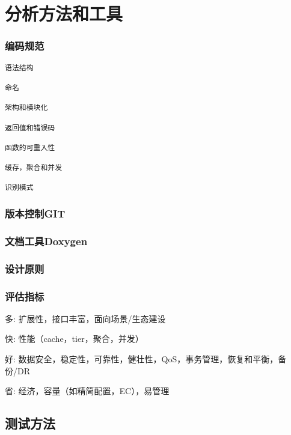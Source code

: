\chapter{分析方法和工具}

\subsection{编码规范}

\begin{lstlisting}
语法结构

命名

架构和模块化

返回值和错误码

函数的可重入性

缓存，聚合和并发

识别模式
\end{lstlisting}

\subsection{版本控制GIT}

\subsection{文档工具Doxygen}


\subsection{设计原则}

\subsection{评估指标}

\begin{itembox}
\item 多: 扩展性，接口丰富，面向场景/生态建设
\item 快: 性能（cache，tier，聚合，并发）
\item 好: 数据安全，稳定性，可靠性，健壮性，QoS，事务管理，恢复和平衡，备份/DR
\item 省: 经济，容量（如精简配置，EC），易管理
\end{itembox}

\section{测试方法}

